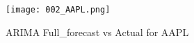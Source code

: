 \documentclass{article}
\begin{document}
\begin{figure}[h]
\centering
\texttt{[image: 002\_AAPL.png]}
\caption{ARIMA Full_forecast vs Actual for AAPL}
\label{fig:AAPL_full_forecast}
\end{figure}
\end{document}
